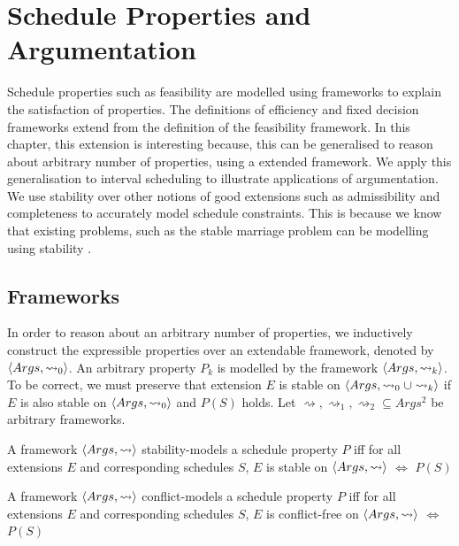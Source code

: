 \chapter{Schedule Properties and Argumentation}

Schedule properties such as feasibility are modelled using frameworks to explain the satisfaction of properties. The definitions of efficiency and fixed decision frameworks extend from the definition of the feasibility framework. In this chapter, this extension is interesting because, this can be generalised to reason about arbitrary number of properties, using a extended framework. We apply this generalisation to interval scheduling to illustrate applications of argumentation.
\linespace 
We use stability over other notions of good extensions such as admissibility and completeness to accurately model schedule constraints. This is because we know that existing problems, such as the stable marriage problem can be modelling using stability \cite{aa}.

\section{Frameworks}
\label{unionframeworks}

In order to reason about an arbitrary number of properties, we inductively construct the expressible properties over an extendable framework, denoted by $\langle{Args},{\rightsquigarrow_0}\rangle$. An arbitrary property $P_k$ is modelled by the framework $\langle{Args},{\rightsquigarrow_k}\rangle$. To be correct, we must preserve that extension $E$ is stable on $\langle{Args},{\rightsquigarrow_0\cup\rightsquigarrow_k}\rangle$ if $E$ is also stable on $\langle{Args},{\rightsquigarrow_0}\rangle$ and $P(S)$ holds. Let $\rightsquigarrow,\rightsquigarrow_1,\rightsquigarrow_2\subseteq Args^2$ be arbitrary frameworks.

\begin{definition}
	A framework $\langle{Args},{\rightsquigarrow}\rangle$ stability-models a schedule property $P$ iff for all extensions $E$ and corresponding schedules $S$, $E$ is stable on $\langle{Args},{\rightsquigarrow}\rangle$ $\Leftrightarrow$ $P(S)$
\end{definition}

\begin{definition}
	A framework $\langle{Args},{\rightsquigarrow}\rangle$ conflict-models a schedule property $P$ iff for all extensions $E$ and corresponding schedules $S$, $E$ is conflict-free on $\langle{Args},{\rightsquigarrow}\rangle$ $\Leftrightarrow$ $P(S)$
\end{definition}

